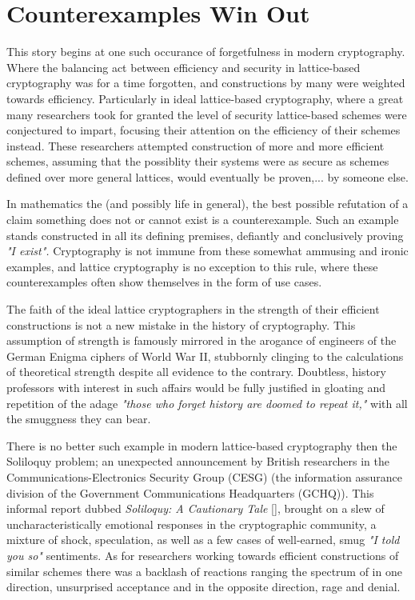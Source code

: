 \section{Counterexamples Win Out}


This story begins at one such occurance of forgetfulness in modern cryptography. Where the balancing act between efficiency and security in lattice-based cryptography was for a time forgotten, and constructions by many were weighted towards efficiency. Particularly in ideal lattice-based cryptography, where a great many researchers took for granted the level of security lattice-based schemes were conjectured to impart, focusing their attention on the efficiency of their schemes instead. These researchers attempted construction of more and more efficient schemes, assuming that the possiblity their systems were as secure as schemes defined over more general lattices, would eventually be proven,... by someone else. 


In mathematics the (and possibly life in general), the best possible refutation of a claim something does not or cannot exist is a counterexample. Such an example stands constructed in all its defining premises, defiantly and conclusively proving \emph{"I exist".} Cryptography is not immune from these somewhat ammusing and ironic examples, and lattice cryptography is no exception to this rule, where these counterexamples often show themselves in the form of use cases.


The faith of the ideal lattice cryptographers in the strength of their efficient constructions is not a new mistake in the history of cryptography. This assumption of strength is famously mirrored in the arogance of engineers of the German Enigma ciphers of World War II, stubbornly clinging to the calculations of theoretical strength despite all evidence to the contrary. Doubtless, history professors with interest in such affairs would be fully justified in gloating and repetition of the adage \emph{"those who forget history are doomed to repeat it,"} with all the smuggness they can bear. 


There is no better such example in modern lattice-based cryptography then the Soliloquy problem; an unexpected announcement by British researchers in the Communications-Electronics Security Group (CESG) (the information assurance division of the Government Communications Headquarters (GCHQ)). This informal report dubbed \textit{Soliloquy: A Cautionary Tale} [], brought on a slew of uncharacteristically emotional responses in the cryptographic community, a mixture of shock, speculation, as well as a few cases of well-earned, smug \emph{"I told you so"} sentiments. As for researchers working towards efficient constructions of similar schemes there was a backlash of reactions ranging the spectrum of in one direction, unsurprised acceptance and in the opposite direction, rage and denial. 

